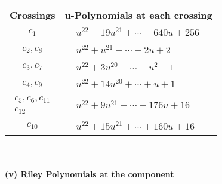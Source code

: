 \documentclass[1p]{elsarticle_modified}
\theoremstyle{definition}
\begin{document}
\begin{tabular}{m{50pt}|m{274pt}}
Crossings & \hspace{64pt}u-Polynomials at each crossing \\
\hline $$\begin{aligned}c_{1}\end{aligned}$$&$\begin{aligned}
&u^{22}-19 u^{21}+\cdots-640 u+256
\end{aligned}$\\
\hline $$\begin{aligned}c_{2},c_{8}\end{aligned}$$&$\begin{aligned}
&u^{22}+u^{21}+\cdots-2 u+2
\end{aligned}$\\
\hline $$\begin{aligned}c_{3},c_{7}\end{aligned}$$&$\begin{aligned}
&u^{22}+3 u^{20}+\cdots- u^2+1
\end{aligned}$\\
\hline $$\begin{aligned}c_{4},c_{9}\end{aligned}$$&$\begin{aligned}
&u^{22}+14 u^{20}+\cdots+u+1
\end{aligned}$\\
\hline $$\begin{aligned}c_{5},c_{6},c_{11}\\c_{12}\end{aligned}$$&$\begin{aligned}
&u^{22}+9 u^{21}+\cdots+176 u+16
\end{aligned}$\\
\hline $$\begin{aligned}c_{10}\end{aligned}$$&$\begin{aligned}
&u^{22}+15 u^{21}+\cdots+160 u+16
\end{aligned}$\\
\hline
\end{tabular}\\~\\
\newpage\renewcommand{\arraystretch}{1}
\flushleft \textbf{(v) Riley Polynomials at the component}\newline \\
\end{document}
